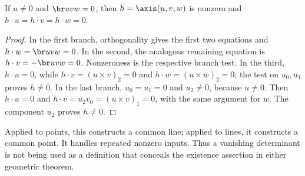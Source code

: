 \begin{lemma}\label{lem:axis}
If $u\ne0$ and $\br u v w=0$, then $h=\axis(u,v,w)$ is nonzero and
$h\cdot u=h\cdot v=h\cdot w=0$.
\end{lemma}
\begin{proof}
In the first branch, orthogonality gives the first two equations and
$h\cdot w=\br u v w=0$. In the second, the analogous remaining equation
is $h\cdot v=-\br u v w=0$. Nonzeroness is the respective branch test.
In the third, $h\cdot u=0$, while
$h\cdot v=(u\times v)_2=0$ and
$h\cdot w=(u\times w)_2=0$; the test on $u_0,u_1$ proves $h\ne0$.
In the last branch, $u_0=u_1=0$ and $u_2\ne0$, because $u\ne0$.
Then $h\cdot u=0$ and
$h\cdot v=u_2v_0=(u\times v)_1=0$, with the same argument for $w$.
The component $u_2$ proves $h\ne0$.
\end{proof}
Applied to points, this constructs a common line; applied to lines, it
constructs a common point. It handles repeated nonzero inputs. Thus a
vanishing determinant is not being used as a definition that conceals the
existence assertion in either geometric theorem.

